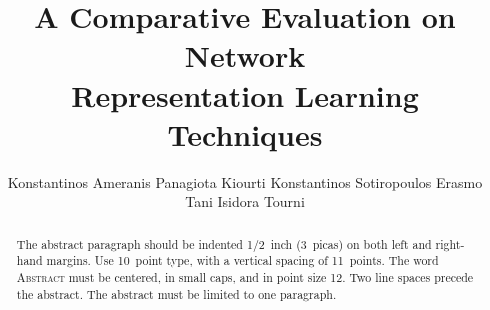 \documentclass{article} %
\title{A Comparative Evaluation on Network \\Representation Learning Techniques}
\author{Konstantinos Ameranis \And Panagiota Kiourti \And Konstantinos Sotiropoulos \AND Erasmo Tani \And Isidora Tourni}
\begin{document}
\maketitle

\begin{abstract}
The abstract paragraph should be indented 1/2~inch (3~picas) on both left and
right-hand margins. Use 10~point type, with a vertical spacing of 11~points.
The word \textsc{Abstract} must be centered, in small caps, and in point size 12. Two
line spaces precede the abstract. The abstract must be limited to one
paragraph.
\end{abstract}










\end{document}
